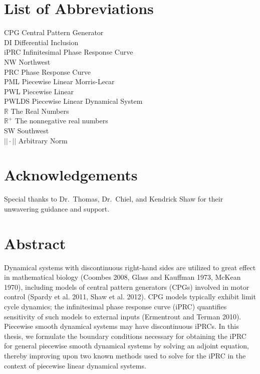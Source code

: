 \documentclass[12pt]{article}
\begin{document}
\section*{List of Abbreviations}
CPG Central Pattern Generator\\
DI Differential Inclusion\\
iPRC Infinitesimal Phase Response Curve\\
NW Northwest\\
PRC Phase Response Curve\\
PML Piecewise Linear Morris-Lecar\\
PWL Piecewise Linear\\
PWLDS Piecewise Linear Dynamical System\\
$\mathbb{R}$ The Real Numbers\\
$\mathbb{R}^+$ The nonnegative real numbers\\
SW Southwest\\
$||\cdot||$ Arbitrary Norm\\
\newpage

\section*{Acknowledgements}
Special thanks to Dr.~Thomas, Dr.~Chiel, and Kendrick Shaw for their unwavering guidance and support.  
\newpage




\section*{Abstract}
Dynamical systems with discontinuous right-hand sides are utilized to great effect in mathematical biology (Coombes 2008, Glass and Kauffman 1973, McKean 1970), including models of central pattern generators (CPGs) involved in motor control (Spardy et al. 2011, Shaw et al. 2012).  CPG models typically exhibit limit cycle dynamics; the infinitesimal phase response curve (iPRC) quantifies sensitivity of such models to external inputs (Ermentrout and Terman 2010).  Piecewise smooth dynamical systems may have discontinuous iPRCs.  In this thesis, we formulate the boundary conditions necessary for obtaining the iPRC for general piecewise smooth dynamical systems by solving an adjoint equation, thereby improving upon two known methods used to solve for the iPRC in the context of piecewise linear dynamical systems.
\newpage
\end{document}
